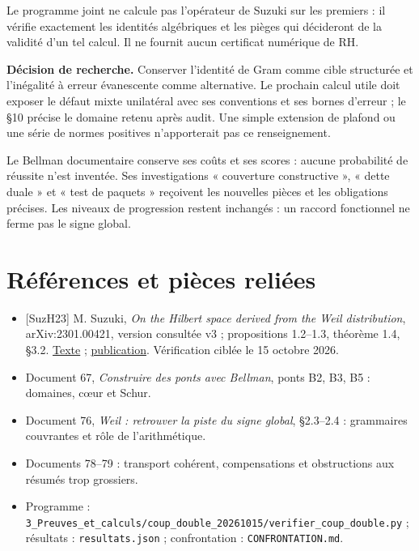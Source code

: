 \documentclass[
  11pt,
]{article}
\providecommand{\tightlist}{%
  \setlength{\itemsep}{0pt}\setlength{\parskip}{0pt}}
\begin{document}
Le programme joint ne calcule pas l'opérateur de Suzuki sur les premiers
: il vérifie exactement les identités algébriques et les pièges qui
décideront de la validité d'un tel calcul. Il ne fournit aucun
certificat numérique de RH.

\textbf{Décision de recherche.} Conserver l'identité de Gram comme cible
structurée et l'inégalité à erreur évanescente comme alternative. Le
prochain calcul utile doit exposer le défaut mixte unilatéral avec ses
conventions et ses bornes d'erreur ; le §10 précise le domaine retenu
après audit. Une simple extension de plafond ou une série de normes
positives n'apporterait pas ce renseignement.

Le Bellman documentaire conserve ses coûts et ses scores : aucune
probabilité de réussite n'est inventée. Ses investigations « couverture
constructive », « dette duale » et « test de paquets » reçoivent les
nouvelles pièces et les obligations précises. Les niveaux de progression
restent inchangés : un raccord fonctionnel ne ferme pas le signe global.

\hypertarget{ruxe9fuxe9rences-et-piuxe8ces-reliuxe9es}{%
\section{Références et pièces
reliées}\label{ruxe9fuxe9rences-et-piuxe8ces-reliuxe9es}}

\begin{itemize}
\tightlist
\item
  {[}SuzH23{]} M. Suzuki, \emph{On the Hilbert space derived from the
  Weil distribution}, arXiv:2301.00421, version consultée v3 ;
  propositions 1.2--1.3, théorème 1.4, §3.2.
  \href{https://arxiv.org/html/2301.00421v3}{Texte} ;
  \href{https://www.cambridge.org/core/journals/canadian-journal-of-mathematics/article/on-the-hilbert-space-derived-from-the-weil-distribution/FD33EBD117A6B448053450DD8D62ADB6}{publication}.
  Vérification ciblée le 15 octobre 2026.
\item
  Document 67, \emph{Construire des ponts avec Bellman}, ponts B2, B3,
  B5 : domaines, cœur et Schur.
\item
  Document 76, \emph{Weil : retrouver la piste du signe global},
  §2.3--2.4 : grammaires couvrantes et rôle de l'arithmétique.
\item
  Documents 78--79 : transport cohérent, compensations et obstructions
  aux résumés trop grossiers.
\item
  Programme :
  \texttt{3\_Preuves\_et\_calculs/coup\_double\_20261015/verifier\_coup\_double.py}
  ; résultats : \texttt{resultats.json} ; confrontation :
  \texttt{CONFRONTATION.md}.
\end{itemize}
\end{document}
